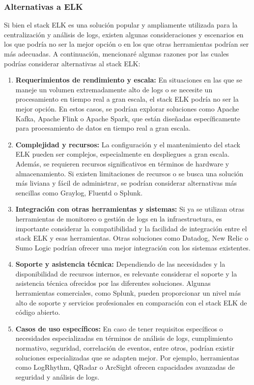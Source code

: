 \subsubsection{Alternativas a ELK}

Si bien el stack ELK es una solución popular y ampliamente utilizada para la centralización y análisis de logs, existen algunas consideraciones y escenarios en los que podría no ser la mejor opción o en los que otras herramientas podrían ser más adecuadas. A continuación, mencionaré algunas razones por las cuales podrías considerar alternativas al stack ELK:

\begin{enumerate}
\item \textbf{Requerimientos de rendimiento y escala:} En situaciones en las que se maneje un volumen extremadamente alto de logs o se necesite un procesamiento en tiempo real a gran escala, el stack ELK podría no ser la mejor opción. En estos casos, se podrían explorar soluciones como Apache Kafka, Apache Flink o Apache Spark, que están diseñadas específicamente para procesamiento de datos en tiempo real a gran escala.

\item \textbf{Complejidad y recursos:} La configuración y el mantenimiento del stack ELK pueden ser complejos, especialmente en despliegues a gran escala. Además, se requieren recursos significativos en términos de hardware y almacenamiento. Si existen limitaciones de recursos o se busca una solución más liviana y fácil de administrar, se podrían considerar alternativas más sencillas como Graylog, Fluentd o Splunk.

\item \textbf{Integración con otras herramientas y sistemas:} Si ya se utilizan otras herramientas de monitoreo o gestión de logs en la infraestructura, es importante considerar la compatibilidad y la facilidad de integración entre el stack ELK y esas herramientas. Otras soluciones como Datadog, New Relic o Sumo Logic podrían ofrecer una mejor integración con los sistemas existentes.

\item \textbf{Soporte y asistencia técnica:} Dependiendo de las necesidades y la disponibilidad de recursos internos, es relevante considerar el soporte y la asistencia técnica ofrecidos por las diferentes soluciones. Algunas herramientas comerciales, como Splunk, pueden proporcionar un nivel más alto de soporte y servicios profesionales en comparación con el stack ELK de código abierto.

\item \textbf{Casos de uso específicos:} En caso de tener requisitos específicos o necesidades especializadas en términos de análisis de logs, cumplimiento normativo, seguridad, correlación de eventos, entre otros, podrían existir soluciones especializadas que se adapten mejor. Por ejemplo, herramientas como LogRhythm, QRadar o ArcSight ofrecen capacidades avanzadas de seguridad y análisis de logs.

\end{enumerate}

\clearpage
